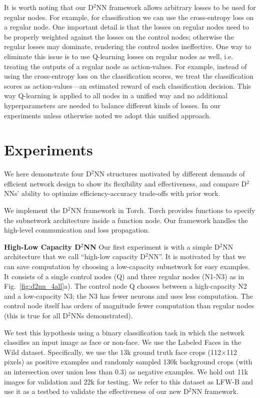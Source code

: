 \documentclass[10pt,twocolumn,letterpaper]{article}
\newcommand{\smallparagraph}[1]{\smallskip \noindent \textbf{#1}}
\begin{document}
It is worth noting that our D$^2$NN framework allows arbitrary losses to be used for
regular nodes. For example, for classification we can use the
cross-entropy loss on a regular node. One important detail is that the losses on regular
nodes need to be properly weighted against the losses on the control nodes; otherwise
the regular losses may dominate, rendering the control nodes ineffective. One way to
eliminate this issue is to use Q-learning losses on regular nodes as well, i.e.\@
treating the outputs of a regular node as action-values. For example, instead of using the cross-entropy loss on the classification
scores, we treat the classification scores as action-values---an estimated reward of
each classification decision. This way Q-learning is applied to all nodes in a unified way
and no additional hyperparameters are needed to balance different kinds of losses. 
In our
experiments unless otherwise noted we adopt this unified approach. 

\section{Experiments}

We here demonstrate four D$^2$NN structures motivated by different demands of efficient network design to show its flexibility and effectiveness, and compare D$^2$NNs' ability to optimize efficiency-accuracy trade-offs with prior work.

We implement the D$^2$NN framework in Torch. Torch
provides functions to specify the subnetwork architecture inside a
function node. Our framework 
handles the high-level communication and loss propagation. 

\smallparagraph{High-Low Capacity D$^2$NN}
Our first experiment is with a simple D$^2$NN architecture that we call ``high-low
capacity D$^2$NN''. It is motivated by that we can save computation by choosing a low-capacity
subnetwork for easy examples. 
It consists of a single control nodes (Q) and three regular nodes
(N1-N3) as in Fig.~\ref{fig:d2nn_4all}a). 
The control node Q chooses between a high-capacity N2 and a
low-capacity N3; the N3 has fewer neurons and uses less
computation. The control node itself has orders of magnitude fewer computation than regular nodes (this is true for all D$^2$NNs demonstrated).

We test this hypothesis using a binary classification task in which the network
classifies an input image as face or non-face. We use the Labeled Faces in the Wild 
\cite{LFWTech,LFWTechUpdate} dataset. Specifically, we use the 13k ground truth face crops (112$\times$112
pixels) as positive examples and randomly sampled 130k background crops (with an intersection over
  union less than 0.3) as
negative examples. We hold out 11k images for validation and 22k for testing. We
refer to this dataset as LFW-B and use it as a testbed to validate the
effectiveness of our new D$^2$NN framework. 
\end{document}
